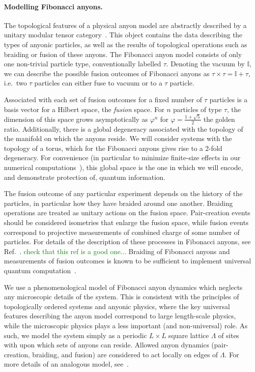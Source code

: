 \documentclass[aps, prl, letterpaper, twocolumn, superscriptaddress, notitlepage, 10pt]{revtex4-1}
\newcommand{\stf}[1]{\textcolor{green}{#1}}
\begin{document}
\paragraph{Modelling Fibonacci anyons.}

The topological features of a physical anyon model are abstractly described by a unitary 
modular tensor category~\cite{Wang2010b}. This object contains the data describing the 
types of anyonic particles, as well as the results of topological operations such as braiding or 
fusion of these anyons. The Fibonacci anyon model consists of only one non-trivial particle 
type, conventionally labelled $\tau$. Denoting the vacuum by $\mathbb{I}$, we can describe 
the possible fusion outcomes of Fibonacci anyons as $\tau\times\tau=\mathbb{I}+\tau$, 
i.e.~two $\tau$ particles can either fuse to vacuum or to a $\tau$ particle.

Associated with each set of fusion outcomes for a fixed number of $\tau$ particles is a basis 
vector for a Hilbert space, the \emph{fusion} space. For $n$ particles of type $\tau$, the 
dimension of this space grows asymptotically as $\varphi^n$ for $\varphi=\frac{1+\sqrt{5}}{2}$ 
the golden ratio. Additionally, there is a global degeneracy associated with the topology of the 
manifold on which the anyons reside. We will consider systems with the topology of a torus, 
which for the Fibonacci anyons gives rise to a 2-fold degeneracy. For convenience 
(in particular to minimize finite-size effects in our numerical computations~\cite{Brell2013}), 
this global space is the one in which we will encode, and demonstrate protection of, quantum 
information.
	
The fusion outcome of any particular experiment depends on the history of the particles, in 
particular how they have braided around one another. Braiding operations are treated as 
unitary actions on the fusion space. Pair-creation events should be considered isometries 
that enlarge the fusion space, while fusion events correspond to projective measurements 
of combined charge of some number of particles. For details of the description of these 
processes in Fibonacci anyons, see Ref.~\cite{Trebst2008}. 
\stf{check that this ref is a good one...} 
Braiding of Fibonacci anyons and measurements of fusion outcomes is known to be 
sufficient to implement universal quantum computation~\cite{?}.

We use a phenomenological model of Fibonacci anyon dynamics which neglects any 
microscopic details of the system. This is consistent with the principles of topologically 
ordered systems and anyonic physics, where the key universal features describing the 
anyon model correspond to large length-scale physics, while the microscopic physics plays 
a less important (and non-universal) role. As such, we model the system simply as a 
periodic $L\times L$ square lattice $\Lambda$ of sites with upon which sets of anyons can 
reside. Allowed anyon dynamics (pair-creation, braiding, and fusion) are considered to act 
locally on edges of $\Lambda$. For more details of an analogous model, see~\cite{Brell2013}.
	
\end{document}
